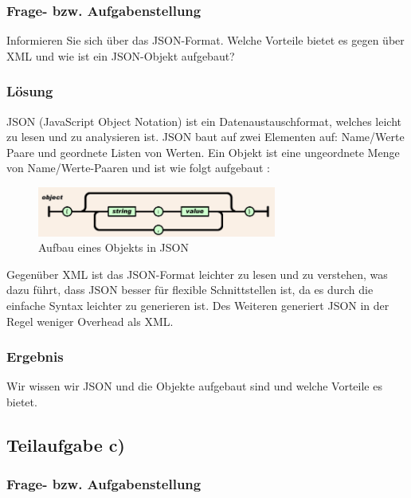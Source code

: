 \subsubsection{Frage- bzw. Aufgabenstellung}

Informieren Sie sich über das JSON-Format. Welche Vorteile bietet es gegen über XML und wie ist ein JSON-Objekt aufgebaut?

\subsubsection{Lösung}

JSON (JavaScript Object Notation) ist ein Datenaustauschformat, welches leicht zu lesen und zu analysieren ist. JSON baut auf zwei Elementen auf: Name/Werte Paare und geordnete Listen von Werten. 
Ein Objekt ist eine ungeordnete Menge von Name/Werte-Paaren und ist wie folgt aufgebaut : \cite{[4]}
\begin{figure}[htbp]
\begin{center}
\includegraphics[width=0.7\textwidth]{JSONObject}
\caption{Aufbau eines Objekts in JSON}
\end{center}
\end{figure}

Gegenüber XML ist das JSON-Format leichter zu lesen und zu verstehen, was dazu führt, dass JSON besser für flexible Schnittstellen ist, da es durch die einfache Syntax leichter zu generieren ist. Des Weiteren generiert JSON in der Regel weniger Overhead als XML. \cite{[5]}

\subsubsection{Ergebnis}

Wir wissen wir JSON und die Objekte aufgebaut sind und welche Vorteile es bietet.

\subsection{Teilaufgabe c)}

\subsubsection{Frage- bzw. Aufgabenstellung}

